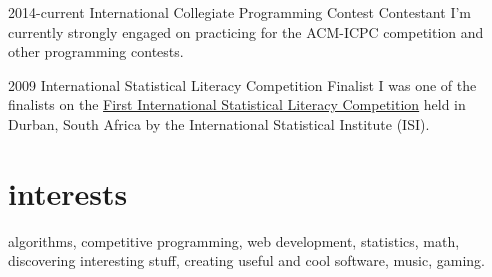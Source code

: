\documentclass[]{friggeri-cv} %
\begin{document}
\begin{entrylist}


\entry
{2014-current}
{International Collegiate Programming Contest}
{Contestant}
{I'm currently strongly engaged on practicing for the ACM-ICPC competition and other programming contests.}

\entry
{2009}
{International Statistical Literacy Competition}
{Finalist}
{I was one of the finalists on the \href{http://iase-web.org/islp/Competitions.php?p=Competitions_2008-2009}{First International Statistical Literacy Competition} held in Durban, South Africa by the International Statistical Institute (ISI).}


\end{entrylist}


\section{interests}

algorithms, competitive programming, web development, statistics, math, discovering interesting stuff, creating useful and cool software, music, gaming.
\end{document}
